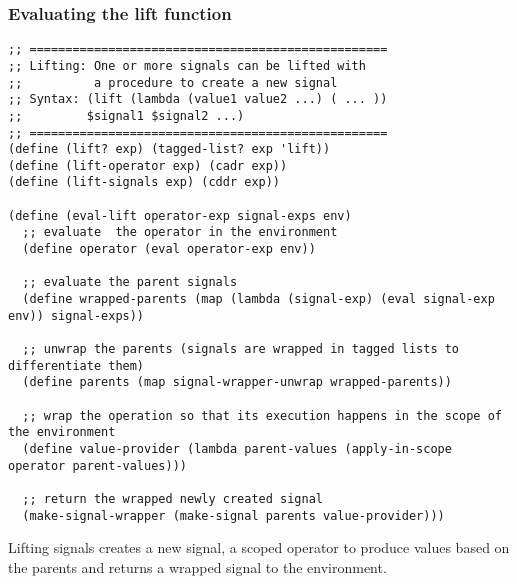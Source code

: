 \subsubsection{Evaluating the lift function}
\begin{lstlisting}
;; ==================================================
;; Lifting: One or more signals can be lifted with
;;          a procedure to create a new signal
;; Syntax: (lift (lambda (value1 value2 ...) ( ... )) 
;;         $signal1 $signal2 ...)
;; ==================================================
(define (lift? exp) (tagged-list? exp 'lift))
(define (lift-operator exp) (cadr exp))
(define (lift-signals exp) (cddr exp))

(define (eval-lift operator-exp signal-exps env)
  ;; evaluate  the operator in the environment
  (define operator (eval operator-exp env))
  
  ;; evaluate the parent signals
  (define wrapped-parents (map (lambda (signal-exp) (eval signal-exp env)) signal-exps))
  
  ;; unwrap the parents (signals are wrapped in tagged lists to differentiate them)
  (define parents (map signal-wrapper-unwrap wrapped-parents)) 
  
  ;; wrap the operation so that its execution happens in the scope of the environment
  (define value-provider (lambda parent-values (apply-in-scope operator parent-values)))
  
  ;; return the wrapped newly created signal
  (make-signal-wrapper (make-signal parents value-provider)))
\end{lstlisting}

Lifting signals creates a new signal, a scoped operator to produce values based on the parents and returns a wrapped signal to the environment. 

\newpage
